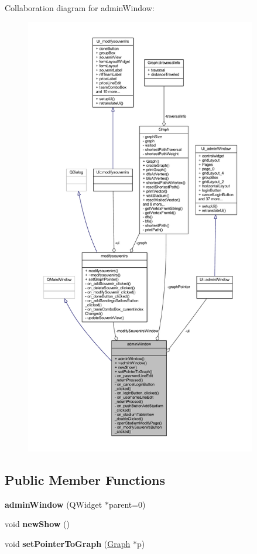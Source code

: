 Collaboration diagram for admin\+Window\+:
\nopagebreak
\begin{figure}[H]
\begin{center}
\leavevmode
\includegraphics[height=550pt]{classadmin_window__coll__graph}
\end{center}
\end{figure}
\subsection*{Public Member Functions}
\begin{DoxyCompactItemize}
\item 
\mbox{\label{classadmin_window_aa87a28958c1a314408df44e88c886ac5}} 
{\bfseries admin\+Window} (Q\+Widget $\ast$parent=0)
\item 
\mbox{\label{classadmin_window_a82510bb37f35a28caa9049a127b047fe}} 
void {\bfseries new\+Show} ()
\item 
\mbox{\label{classadmin_window_a0a12fa17f4293753eeb62137c06d7773}} 
void {\bfseries set\+Pointer\+To\+Graph} (\hyperlink{class_graph}{Graph} $\ast$p)
\end{DoxyCompactItemize}
